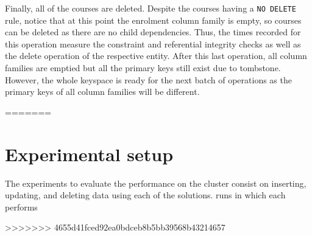 \begin{description}
Finally, all of the courses are deleted. Despite the courses having a \texttt{NO
DELETE} rule, notice that at this point the enrolment column family is empty, so
courses can be deleted as there are no child dependencies. Thus, the times
recorded for this operation measure the constraint and referential integrity
checks as well as the delete operation of the respective entity. After this last
operation, all column families are emptied but all the primary keys still exist
due to tombstone. However, the whole keyspace is ready for the next batch of
operations as the primary keys of all column families will be different.


\end{description}		

			
			

		
 
=======
\section{Experimental setup}
	The experiments to evaluate the performance on the cluster consist on 
	inserting, updating, and deleting data using each of the solutions.    
	runs in which each performs 
	
>>>>>>> 4655d41fced92ea0bdceb8b5bb39568b43214657





